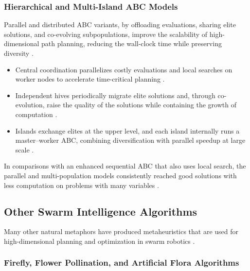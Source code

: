 \subsubsection{Hierarchical and Multi-Island ABC Models}

Parallel and distributed ABC variants, by offloading evaluations, sharing elite
solutions, and co-evolving subpopulations, improve the scalability of
high-dimensional path planning, reducing the wall-clock time while preserving
diversity \cite{panigrahi2011handbook}.
\begin{itemize}
  \item {} Central coordination parallelizes costly
        evaluations and local searches on worker nodes to accelerate
        time-critical planning \cite{panigrahi2011handbook}.
  \item {} Independent hives periodically
        migrate elite solutions and, through co-evolution, raise the quality of
        the solutions while containing the growth of computation
        \cite{panigrahi2011handbook}.
  \item {} Islands exchange elites at the
        upper level, and each island internally runs a master--worker ABC,
        combining diversification with parallel speedup at large scale
        \cite{panigrahi2011handbook}.
\end{itemize}
In comparisons with an enhanced sequential ABC that also uses local search, the
parallel and multi-population models consistently reached good solutions with
less computation on problems with many variables \cite{panigrahi2011handbook}.

\subsection{Other Swarm Intelligence Algorithms}

Many other natural metaphors have produced metaheuristics that are used for
high-dimensional planning and optimization in swarm robotics
\cite{shahzad2023review,nguyen2024swarm}.

\subsubsection{Firefly, Flower Pollination, and Artificial Flora Algorithms}

